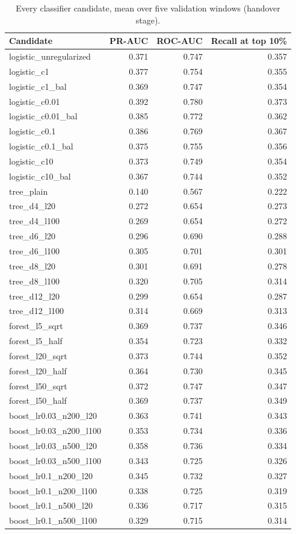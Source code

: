 \begin{table}[H]
\centering\small
\caption{Every classifier candidate, mean over five validation windows (handover stage).}
\label{tab:app-classifier}
\begin{tabular}{@{}lrrr@{}}
\toprule
Candidate & PR-AUC & ROC-AUC & Recall at top 10\% \\
\midrule
logistic\_unregularized & 0.371 & 0.747 & 0.357 \\
logistic\_c1 & 0.377 & 0.754 & 0.355 \\
logistic\_c1\_bal & 0.369 & 0.747 & 0.354 \\
logistic\_c0.01 & 0.392 & 0.780 & 0.373 \\
logistic\_c0.01\_bal & 0.385 & 0.772 & 0.362 \\
logistic\_c0.1 & 0.386 & 0.769 & 0.367 \\
logistic\_c0.1\_bal & 0.375 & 0.755 & 0.356 \\
logistic\_c10 & 0.373 & 0.749 & 0.354 \\
logistic\_c10\_bal & 0.367 & 0.744 & 0.352 \\
tree\_plain & 0.140 & 0.567 & 0.222 \\
tree\_d4\_l20 & 0.272 & 0.654 & 0.273 \\
tree\_d4\_l100 & 0.269 & 0.654 & 0.272 \\
tree\_d6\_l20 & 0.296 & 0.690 & 0.288 \\
tree\_d6\_l100 & 0.305 & 0.701 & 0.301 \\
tree\_d8\_l20 & 0.301 & 0.691 & 0.278 \\
tree\_d8\_l100 & 0.320 & 0.705 & 0.314 \\
tree\_d12\_l20 & 0.299 & 0.654 & 0.287 \\
tree\_d12\_l100 & 0.314 & 0.669 & 0.313 \\
forest\_l5\_sqrt & 0.369 & 0.737 & 0.346 \\
forest\_l5\_half & 0.354 & 0.723 & 0.332 \\
forest\_l20\_sqrt & 0.373 & 0.744 & 0.352 \\
forest\_l20\_half & 0.364 & 0.730 & 0.345 \\
forest\_l50\_sqrt & 0.372 & 0.747 & 0.347 \\
forest\_l50\_half & 0.369 & 0.737 & 0.349 \\
boost\_lr0.03\_n200\_l20 & 0.363 & 0.741 & 0.343 \\
boost\_lr0.03\_n200\_l100 & 0.353 & 0.734 & 0.336 \\
boost\_lr0.03\_n500\_l20 & 0.358 & 0.736 & 0.334 \\
boost\_lr0.03\_n500\_l100 & 0.343 & 0.725 & 0.326 \\
boost\_lr0.1\_n200\_l20 & 0.345 & 0.732 & 0.327 \\
boost\_lr0.1\_n200\_l100 & 0.338 & 0.725 & 0.319 \\
boost\_lr0.1\_n500\_l20 & 0.336 & 0.717 & 0.315 \\
boost\_lr0.1\_n500\_l100 & 0.329 & 0.715 & 0.314 \\
\bottomrule
\end{tabular}
\end{table}